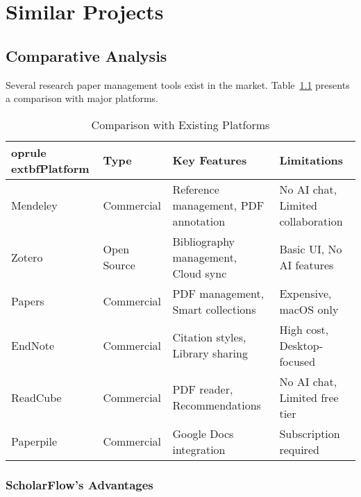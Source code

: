 \chapter{Similar Projects}
\label{ch:similar-projects}

\section{Comparative Analysis}
\label{sec:comparative-analysis}

Several research paper management tools exist in the market. Table~\ref{tab:competitors} presents a comparison with major platforms.

\begin{table}[H]
\centering
\caption{Comparison with Existing Platforms}
\label{tab:competitors}
\small
\setlength{\tabcolsep}{6pt}%
\renewcommand{\arraystretch}{1.15}%
\begin{tabularx}{\textwidth}{@{} l l >{\raggedright\arraybackslash}X >{\raggedright\arraybackslash}X @{} }
	oprule
	extbf{Platform} & \textbf{Type} & \textbf{Key Features} & \textbf{Limitations} \\
\midrule
Mendeley & Commercial & Reference management, PDF annotation & No AI chat, Limited collaboration \\
Zotero & Open Source & Bibliography management, Cloud sync & Basic UI, No AI features \\
Papers & Commercial & PDF management, Smart collections & Expensive, macOS only \\
EndNote & Commercial & Citation styles, Library sharing & High cost, Desktop-focused \\
ReadCube & Commercial & PDF reader, Recommendations & No AI chat, Limited free tier \\
Paperpile & Commercial & Google Docs integration & Subscription required \\
\bottomrule
\end{tabularx}
\end{table}

\subsection{ScholarFlow's Advantages}

